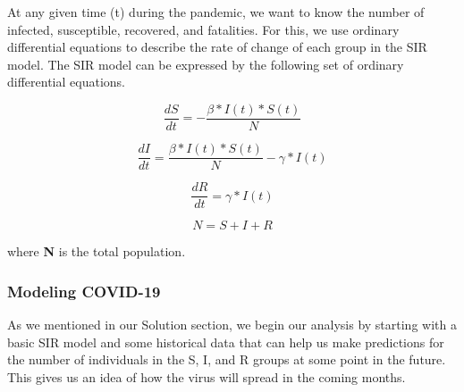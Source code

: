 \documentclass[11pt]{article}
\begin{document}
At any given time (t) during the pandemic, we want to know the number of infected, susceptible, recovered, and fatalities. For this, we use ordinary differential equations to describe the rate of change of each group in the SIR model. The SIR model can be expressed by the following set of ordinary differential equations.

\begin{equation}
    \label{eq2}
    \frac{dS}{dt} = - \frac{\beta * I(t) * S(t)}{N}
\end{equation}

\begin{equation}
    \label{eq3}
    \frac{dI}{dt} = \frac{\beta * I(t) * S(t)}{N} - \gamma * I(t) 
\end{equation}

\begin{equation}
    \label{eq4}
    \frac{dR}{dt} = \gamma * I(t) 
\end{equation}

\begin{equation}
    \label{eq5}
    N = S + I + R
\end{equation}

where \textbf{N} is the total population.

\subsubsection{Modeling COVID-19}
As we mentioned in our Solution section, we begin our analysis by starting with a basic SIR model and some historical data that can help us make predictions for the number of individuals in the S, I, and R groups at some point in the future. This gives us an idea of how the virus will spread in the coming months. 
\end{document}
